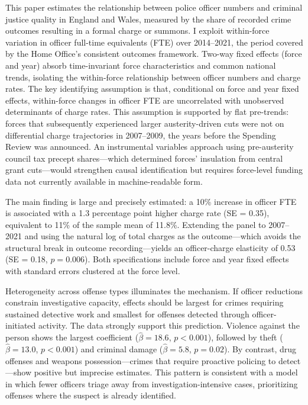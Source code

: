 \documentclass[12pt]{article}
\begin{document}
This paper estimates the relationship between police officer numbers and criminal justice quality in England and Wales, measured by the share of recorded crime outcomes resulting in a formal charge or summons. I exploit within-force variation in officer full-time equivalents (FTE) over 2014--2021, the period covered by the Home Office's consistent outcomes framework. Two-way fixed effects (force and year) absorb time-invariant force characteristics and common national trends, isolating the within-force relationship between officer numbers and charge rates. The key identifying assumption is that, conditional on force and year fixed effects, within-force changes in officer FTE are uncorrelated with unobserved determinants of charge rates. This assumption is supported by flat pre-trends: forces that subsequently experienced larger austerity-driven cuts were not on differential charge trajectories in 2007--2009, the years before the Spending Review was announced. An instrumental variables approach using pre-austerity council tax precept shares---which determined forces' insulation from central grant cuts---would strengthen causal identification but requires force-level funding data not currently available in machine-readable form.

The main finding is large and precisely estimated: a 10\% increase in officer FTE is associated with a 1.3 percentage point higher charge rate (SE = 0.35), equivalent to 11\% of the sample mean of 11.8\%. Extending the panel to 2007--2021 and using the natural log of total charges as the outcome---which avoids the structural break in outcome recording---yields an officer-charge elasticity of 0.53 (SE = 0.18, $p = 0.006$). Both specifications include force and year fixed effects with standard errors clustered at the force level.

Heterogeneity across offense types illuminates the mechanism. If officer reductions constrain investigative capacity, effects should be largest for crimes requiring sustained detective work and smallest for offenses detected through officer-initiated activity. The data strongly support this prediction. Violence against the person shows the largest coefficient ($\hat{\beta} = 18.6$, $p < 0.001$), followed by theft ($\hat{\beta} = 13.0$, $p < 0.001$) and criminal damage ($\hat{\beta} = 5.8$, $p = 0.02$). By contrast, drug offenses and weapons possession---crimes that require proactive policing to detect---show positive but imprecise estimates. This pattern is consistent with a model in which fewer officers triage away from investigation-intensive cases, prioritizing offenses where the suspect is already identified.
\end{document}
